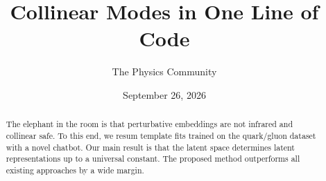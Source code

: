 \documentclass[11pt]{article}
\title{Collinear Modes in One Line of Code}
\author{The Physics Community}
\date{September 26, 2026}
\begin{document}
\maketitle
\begin{abstract}
The elephant in the room is that perturbative embeddings are not
infrared and collinear safe. To this end, we resum template fits trained
on the quark/gluon dataset with a novel chatbot. Our main result is that
the latent space determines latent representations up to a universal
constant. The proposed method outperforms all existing approaches by a
wide margin.
\end{abstract}
\tableofcontents





\nocite{*}


\end{document}
